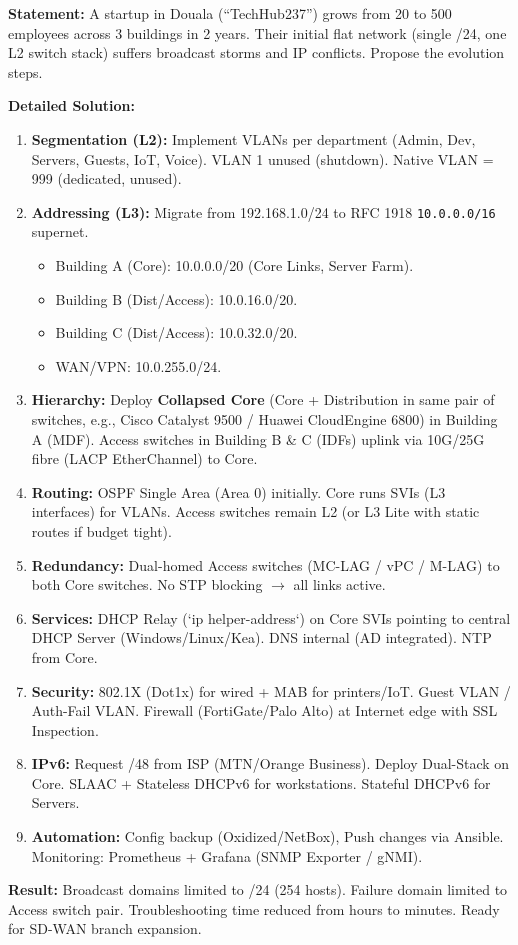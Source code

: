 \documentclass[11pt]{article}
\begin{document}
\begin{exoresolu}
\textbf{Statement:} A startup in Douala (``TechHub237'') grows from 20 to 500 employees across 3 buildings in 2 years. Their initial flat network (single /24, one L2 switch stack) suffers broadcast storms and IP conflicts. Propose the evolution steps.

\textbf{Detailed Solution:}
\begin{enumerate}
\item \textbf{Segmentation (L2):} Implement VLANs per department (Admin, Dev, Servers, Guests, IoT, Voice). VLAN 1 unused (shutdown). Native VLAN = 999 (dedicated, unused).
\item \textbf{Addressing (L3):} Migrate from 192.168.1.0/24 to RFC 1918 \texttt{10.0.0.0/16} supernet.
    \begin{itemize}
    \item Building A (Core): 10.0.0.0/20 (Core Links, Server Farm).
    \item Building B (Dist/Access): 10.0.16.0/20.
    \item Building C (Dist/Access): 10.0.32.0/20.
    \item WAN/VPN: 10.0.255.0/24.
    \end{itemize}
\item \textbf{Hierarchy:} Deploy \textbf{Collapsed Core} (Core + Distribution in same pair of switches, e.g., Cisco Catalyst 9500 / Huawei CloudEngine 6800) in Building A (MDF). Access switches in Building B \& C (IDFs) uplink via 10G/25G fibre (LACP EtherChannel) to Core.
\item \textbf{Routing:} OSPF Single Area (Area 0) initially. Core runs SVIs (L3 interfaces) for VLANs. Access switches remain L2 (or L3 Lite with static routes if budget tight).
\item \textbf{Redundancy:} Dual-homed Access switches (MC-LAG / vPC / M-LAG) to both Core switches. No STP blocking $\to$ all links active.
\item \textbf{Services:} DHCP Relay (`ip helper-address`) on Core SVIs pointing to central DHCP Server (Windows/Linux/Kea). DNS internal (AD integrated). NTP from Core.
\item \textbf{Security:} 802.1X (Dot1x) for wired + MAB for printers/IoT. Guest VLAN / Auth-Fail VLAN. Firewall (FortiGate/Palo Alto) at Internet edge with SSL Inspection.
\item \textbf{IPv6:} Request /48 from ISP (MTN/Orange Business). Deploy Dual-Stack on Core. SLAAC + Stateless DHCPv6 for workstations. Stateful DHCPv6 for Servers.
\item \textbf{Automation:} Config backup (Oxidized/NetBox), Push changes via Ansible. Monitoring: Prometheus + Grafana (SNMP Exporter / gNMI).
\end{enumerate}
\textbf{Result:} Broadcast domains limited to /24 (254 hosts). Failure domain limited to Access switch pair. Troubleshooting time reduced from hours to minutes. Ready for SD-WAN branch expansion.
\end{exoresolu}
\end{document}
